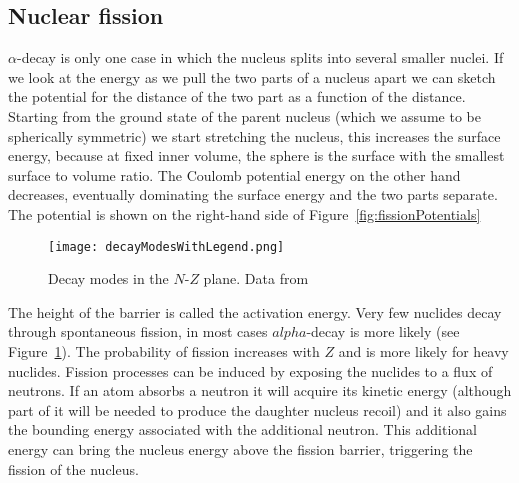 \documentclass[12pt]{article}
\begin{document}
\subsection{Nuclear fission}
%
%
%
$\alpha$-decay is only one case in which the nucleus splits into several smaller nuclei. If we look at the energy as we pull the two parts of a nucleus apart we can sketch the potential for the distance of the two part as a function of the distance. Starting from the ground state of the parent nucleus (which we assume to be spherically symmetric) we start stretching the nucleus, this increases the surface energy, because at fixed inner volume, the sphere is the surface with the smallest surface to volume ratio. The Coulomb potential energy on the other hand decreases, eventually dominating the surface energy and the two parts separate. The potential is shown on the right-hand side of Figure~\ref{fig:fissionPotentials}

\begin{figure}
\begin{center}
\texttt{[image: decayModesWithLegend.png]}   
\end{center}
\caption{Decay modes in the $N$-$Z$ plane. Data from \cite{nndc}}\label{fig:decayModes}
\end{figure} 

The height of the barrier is called the activation energy. Very few nuclides decay through spontaneous fission, in most cases $alpha$-decay is more likely (see Figure~\ref{fig:decayModes}). The probability of fission increases with $Z$ and is more likely for heavy nuclides. Fission processes can be induced by exposing the nuclides to a flux of neutrons. If an atom absorbs a neutron it will acquire its kinetic energy (although part of it will be needed to produce the daughter nucleus recoil) and it also gains the bounding energy associated with the additional neutron. This additional energy can bring the nucleus energy above the fission barrier, triggering the fission of the nucleus. 
\end{document}
